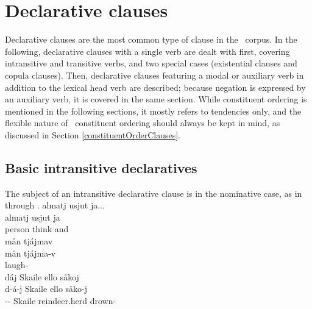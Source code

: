 \section{Declarative clauses}\label{declClauses}
Declarative clauses are the most common type of clause in the \PS\ corpus. In the following, declarative clauses with a single verb are dealt with first, covering intransitive and transitive verbs, and two special cases (existential clauses and copula clauses). Then, declarative clauses featuring a modal or auxiliary verb in addition to the lexical head verb are described; because negation is expressed by an auxiliary verb, it is covered in the same section. While constituent ordering is mentioned in the following sections, it mostly refers to tendencies only, and the flexible nature of \PS\ constituent ordering should always be kept in mind, as discussed in Section \ref{constituentOrderClauses}. 

\subsection{Basic intransitive declaratives}\label{basicIntransDeclaratives}
The subject of an intransitive declarative clause is in the nominative case, %
as in  through . 
\ea\label{basicIntransDeclaratives1}
\glll	almatj usjut ja...\\
	almatj usjut ja\\
	person\BS{} think\BS{} and \\%
 
\z
\ea\label{basicIntransDeclaratives2}
\glll	mån tjájmav\\
	mån tjájma-v\\
	 laugh- \\\nopagebreak
{} 
\z
\ea\label{basicIntransDeclaratives3}
\glll	dáj Skaile ello såkoj\\
	d-á-j Skaile ello såko-j\\
	-- Skaile\BS{} reindeer.herd\BS{} drown- \\\nopagebreak
{} 
\z


